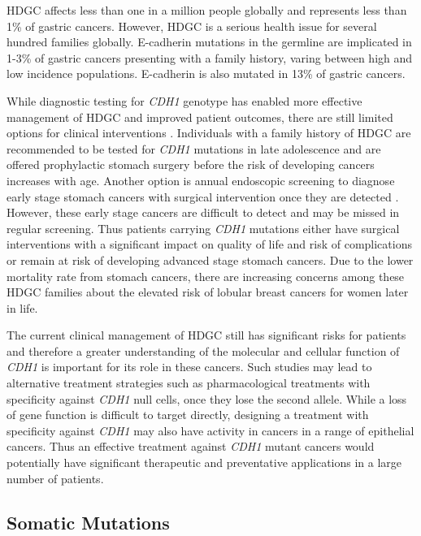 \gls{HDGC} affects less than one in a million people globally \citep{Ferlay2015} and represents less than 1\% of gastric cancers. However, \gls{HDGC} is a serious health issue for several hundred families globally. \gls{E-cadherin} \glspl{mutation} in the \gls{germline} are implicated in 1-3\% of gastric cancers presenting with a family history, varing between high and low incidence populations. \gls{E-cadherin} is also mutated in 13\% of  gastric cancers.

While diagnostic testing for \textit{CDH1} genotype has enabled more effective management of \gls{HDGC} and improved patient outcomes, there are still limited options for clinical interventions \citep{Guilford2010}. Individuals with a family history of \gls{HDGC} are recommended to be tested for \textit{CDH1} \glspl{mutation} in late adolescence and are offered prophylactic stomach surgery before the risk of developing cancers increases with age. Another option is annual endoscopic screening to diagnose early stage stomach cancers with surgical intervention once they are detected \citep{Oliveira2013}. However, these early stage cancers are difficult to detect and may be missed in regular screening. Thus patients carrying \textit{CDH1} \glspl{mutation} either have surgical interventions with a significant impact on quality of life and risk of complications or remain at risk of developing advanced stage stomach cancers. Due to the lower mortality rate from stomach cancers, there are increasing concerns among these \gls{HDGC} families about the elevated risk of lobular breast cancers for women later in life.

The current clinical management of \gls{HDGC} still has significant risks for patients and therefore a greater understanding of the molecular and cellular function of \textit{CDH1} is important for its role in these cancers. Such studies may lead to alternative treatment strategies such as pharmacological \glspl{treatment} with specificity against \textit{CDH1} null cells, once they lose the second \gls{allele}. While a loss of gene function is difficult to target directly, designing a treatment with specificity against \textit{CDH1} may also have activity in  cancers in a range of epithelial cancers. Thus an effective treatment against \textit{CDH1} \gls{mutant} cancers would potentially have significant therapeutic and preventative applications in a large number of patients.

\iffalse
\subsection{Somatic Mutations}
